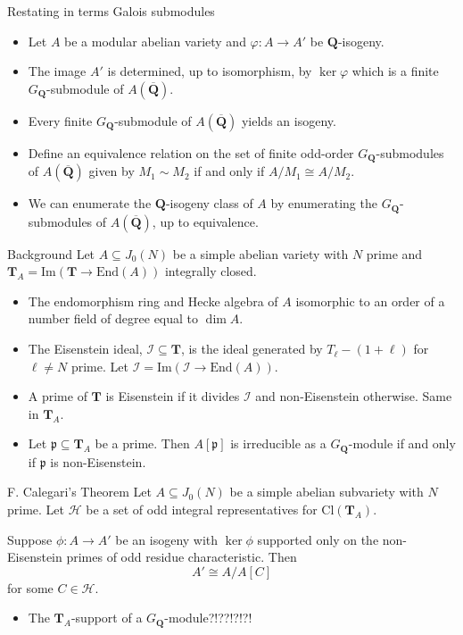 \documentclass{beamer}
\newcommand{\QQ}{\mathbf{Q}}
\newcommand{\QQbar}{\overline{\mathbf{Q}}}
\newcommand{\TT}{\mathbf{T}}
\newcommand{\I}{\mathcal{I}}
\renewcommand{\H}{\mathcal{H}}
\renewcommand{\Im}{\mathrm{Im}}
\newcommand{\Cl}{\mathrm{Cl}}
\newcommand{\End}{\mathrm{End}}
\newcommand{\p}{\mathfrak{p}}
\begin{document}
\begin{frame}{Restating in terms Galois submodules}
    \begin{itemize}
        \item
            Let $A$ be a modular abelian variety and $\varphi:A\to A'$ be
            $\QQ$-isogeny.
        \item
            The image $A'$ is determined, up to isomorphism, by $\ker\varphi$
            which is a finite $G_\QQ$-submodule of $A(\QQbar)$.
        \item
            Every finite $G_\QQ$-submodule of $A(\QQbar)$ yields an isogeny.
        \item
            Define an equivalence relation on the set of finite odd-order
            $G_\QQ$-submodules of $A(\QQbar)$ given by $M_1\sim M_2$ if and only if
            $A/M_1\cong A/M_2$.
        \item
            We can enumerate the $\QQ$-isogeny class of $A$ by enumerating the
            $G_\QQ$-submodules of $A(\QQbar)$, up to equivalence.
    \end{itemize}
\end{frame}

\begin{frame}{Background}
    Let $A\subseteq J_0(N)$ be a simple abelian variety with $N$ prime and
    $\TT_A = \Im(\TT\to \End(A))$ integrally closed.
    \begin{itemize}
        \item
            The endomorphism ring and Hecke algebra of $A$ isomorphic to an
            order of a number field of degree equal to $\dim A$.
        \item
            The Eisenstein ideal, $\mathcal{I}\subseteq \TT$, is the ideal
            generated by $T_\ell-(1+\ell)$ for $\ell\neq N$ prime. Let
            $\I=\Im(\I\to \End(A))$.
        \item
            A prime of $\TT$ is Eisenstein if it divides $\I$ and
            non-Eisenstein otherwise. Same in $\TT_A$.
        \item
            Let $\p\subseteq \TT_A$ be a prime. Then $A[\p]$ is irreducible as
            a $G_\QQ$-module if and only if $\p$ is non-Eisenstein.
    \end{itemize}
\end{frame}


\begin{frame}{F. Calegari's Theorem}
    Let $A\subseteq J_0(N)$ be a simple abelian subvariety with $N$ prime. Let
    $\H$ be a set of odd integral representatives for $\Cl(\TT_A)$.
    \begin{theorem}[F. Calegari]
        Suppose $\phi:A\to A'$ be an isogeny with $\ker\phi$ supported only on the
        non-Eisenstein primes of odd residue characteristic. Then
        \[
            A'\cong A/A[C]
        \]
        for some $C\in \H$.
    \end{theorem}
    \begin{itemize}
        \item
            The $\TT_A$-support of a $G_\QQ$-module?!??!?!?!
    \end{itemize}
\end{frame}
\end{document}
